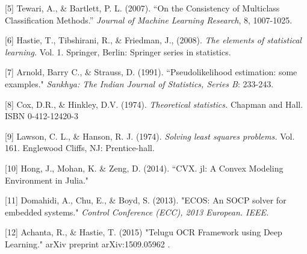 \documentclass{article}
\begin{document}
[5] Tewari, A., \& Bartlett, P. L. (2007). ``On the Consistency of Multiclass Classification Methods.''
\emph{Journal of Machine Learning Research}, 8, 1007-1025.

[6] Hastie, T., Tibshirani, R., \& Friedman, J., (2008). \emph{The elements
of statistical learning.} Vol. 1. Springer, Berlin: Springer series in
statistics.

[7] Arnold, Barry C., \& Strauss, D.  (1991). ``Pseudolikelihood estimation: some examples." \emph{Sankhya: The Indian Journal of Statistics, Series B}: 233-243.

[8] Cox, D.R., \& Hinkley, D.V. (1974). \emph{Theoretical statistics.} Chapman and Hall. ISBN 0-412-12420-3

[9] Lawson, C. L., \& Hanson, R. J. (1974). \emph{Solving least squares problems.} Vol. 161. Englewood Cliffs, NJ: Prentice-hall.

[10] Hong, J., Mohan, K. \& Zeng, D. (2014). ``CVX. jl: A Convex Modeling Environment in Julia."

[11] Domahidi, A., Chu, E., \& Boyd, S. (2013). "ECOS: An SOCP solver for embedded systems." \emph{Control Conference (ECC), 2013 European. IEEE.}

[12] Achanta, R., \& Hastie, T. (2015) "Telugu OCR Framework using Deep Learning." arXiv preprint arXiv:1509.05962 .
\end{document}
